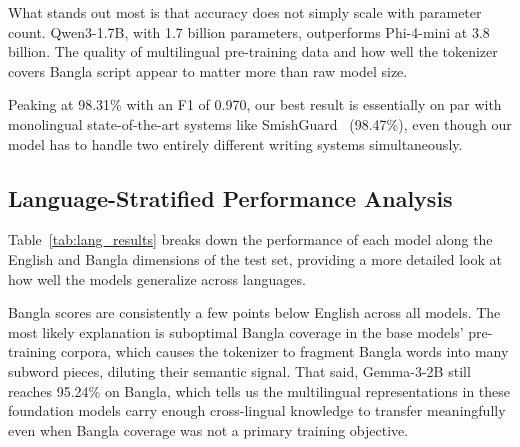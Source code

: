 \documentclass[journal]{IEEEtran}
\begin{document}
What stands out most is that accuracy does not simply scale with parameter count. Qwen3-1.7B, with 1.7 billion parameters, outperforms Phi-4-mini at 3.8 billion. The quality of multilingual pre-training data and how well the tokenizer covers Bangla script appear to matter more than raw model size.

Peaking at 98.31\% with an F1 of 0.970, our best result is essentially on par with monolingual state-of-the-art systems like SmishGuard~\cite{ref6} (98.47\%), even though our model has to handle two entirely different writing systems simultaneously.

\subsection{Language-Stratified Performance Analysis}

Table~\ref{tab:lang_results} breaks down the performance of each model along the English and Bangla dimensions of the test set, providing a more detailed look at how well the models generalize across languages.

\begin{table}[htbp]
\caption{Per-Language Performance Breakdown}
\label{tab:lang_results}
\centering
{}
\end{table}

Bangla scores are consistently a few points below English across all models. The most likely explanation is suboptimal Bangla coverage in the base models' pre-training corpora, which causes the tokenizer to fragment Bangla words into many subword pieces, diluting their semantic signal. That said, Gemma-3-2B still reaches 95.24\% on Bangla, which tells us the multilingual representations in these foundation models carry enough cross-lingual knowledge to transfer meaningfully even when Bangla coverage was not a primary training objective.
\end{document}
